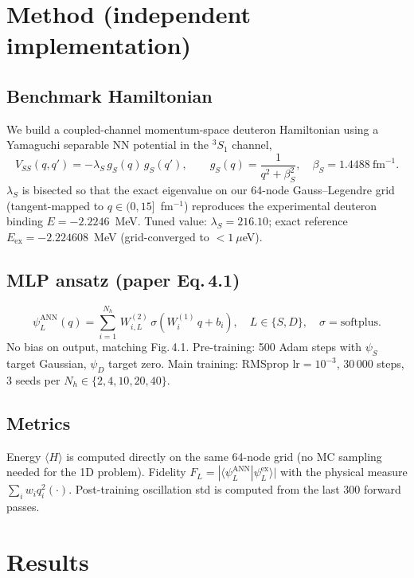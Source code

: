 \documentclass[11pt]{article}
\begin{document}
\section{Method (independent implementation)}

\subsection{Benchmark Hamiltonian}
We build a coupled-channel momentum-space deuteron Hamiltonian using a Yamaguchi
separable NN potential in the $^3S_1$ channel,
\[
  V_{SS}(q, q') = -\lambda_S\, g_S(q)\, g_S(q'), \qquad g_S(q) = \frac{1}{q^2 + \beta_S^2},
  \quad \beta_S = 1.4488\ \text{fm}^{-1}.
\]
$\lambda_S$ is bisected so that the exact eigenvalue on our 64-node Gauss--Legendre grid
(tangent-mapped to $q\in(0,15]$~fm$^{-1}$) reproduces the experimental deuteron binding
$E = -2.2246$~MeV. Tuned value: $\lambda_S = 216.10$; exact reference
$E_{\text{ex}} = -2.224608$~MeV (grid-converged to $<1\ \mu$eV).

\subsection{MLP ansatz (paper Eq.\,4.1)}
\[
  \psi_L^{\text{ANN}}(q) = \sum_{i=1}^{N_h}\, W^{(2)}_{i,L}\,\sigma\!\left(W^{(1)}_i\,q + b_i\right),
  \quad L \in \{S, D\}, \quad \sigma = \mathrm{softplus}.
\]
No bias on output, matching Fig.\,4.1. Pre-training: 500 Adam steps with $\psi_S$ target
Gaussian, $\psi_D$ target zero. Main training: RMSprop $\text{lr}=10^{-3}$, 30\,000 steps,
3 seeds per $N_h \in \{2,4,10,20,40\}$.

\subsection{Metrics}
Energy $\langle H\rangle$ is computed directly on the same 64-node grid (no MC sampling
needed for the 1D problem). Fidelity $F_L = |\langle \psi_L^{\text{ANN}} | \psi_L^{\text{ex}} \rangle|$
with the physical measure $\sum_i w_i q_i^2 (\cdot)$. Post-training oscillation std is
computed from the last 300 forward passes.

\section{Results}
\end{document}
